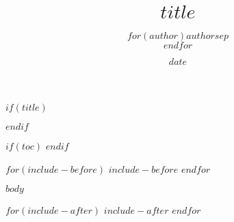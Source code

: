 \documentclass[11pt]{article}
\title{$title$}
\author{$for(author)$$author$$sep$\\$endfor$}
\date{$date$}
\begin{document}
  
$if(title)$
\maketitle
$endif$   

$if(toc)$
\tableofcontents
$endif$

$for(include-before)$
$include-before$
$endfor$

$body$

$for(include-after)$
$include-after$
$endfor$
\end{document}
